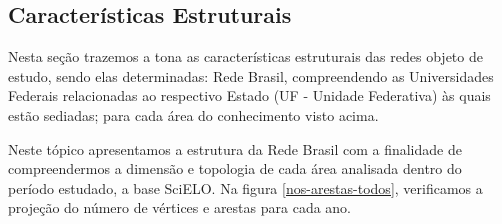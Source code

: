 \subsection{\textbf{Características Estruturais}}

Nesta seção trazemos a tona as características estruturais das redes objeto de estudo, sendo elas determinadas: Rede Brasil, compreendendo as Universidades Federais relacionadas ao respectivo Estado (UF - Unidade Federativa) às quais estão sediadas; para cada área do conhecimento visto acima.

Neste tópico apresentamos a estrutura da Rede Brasil com a finalidade de compreendermos a dimensão e topologia de cada área analisada dentro do período estudado, a base SciELO. Na figura \ref{nos-arestas-todos}, verificamos a projeção do número de vértices e arestas para cada ano. 


